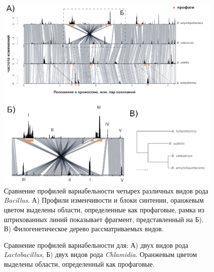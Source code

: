 \begin{figure}[!ht] 
  \center
    \includegraphics[width=\textwidth]{Dissertation/images/complexity/bacillus_compare_v3.png}
  \caption{Сравнение профилей вариабельности четырех различных видов рода \textit{Bacillus}. А) Профили изменчивости и блоки синтении, оранжевым цветом выделены области, определенные как профаговые, рамка из штрихованных линий показывает фрагмент, представленный на Б). В) Филогенетическое дерево рассматриваемых видов.}
  \label{img:species_complex_bacillus} 
\end{figure}


\begin{figure}[!ht] 
  \center
  \caption{Сравнение профилей вариабельности для: А) двух видов рода \textit{Lactobacillus}, Б) двух видов рода \textit{Chlamidia}. Оранжевым цветом выделены области, определенный как профаговые.}
  \label{img:species_complex_lactobacillus_chlam} 
\end{figure}

